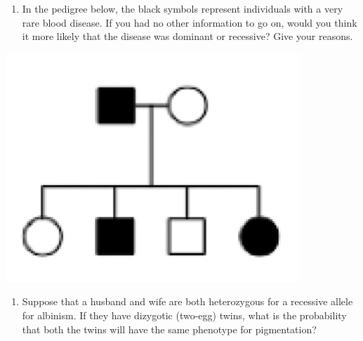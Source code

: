 \documentclass[11pt,]{article}
\providecommand{\tightlist}{%
  \setlength{\itemsep}{0pt}\setlength{\parskip}{0pt}}
\begin{document}
\begin{blackbox}

\begin{enumerate}
\def\labelenumi{\arabic{enumi}.}
\setcounter{enumi}{42}
\tightlist
\item
  In the pedigree below, the black symbols represent individuals with a
  very rare blood disease. If you had no other information to go on,
  would you think it more likely that the disease was dominant or
  recessive? Give your reasons.
\end{enumerate}

\hfill\break

\begin{center}\includegraphics[width=0.35\linewidth,]{input/43pedigree} \end{center}

\vspace{15cm}

\end{blackbox}

\begin{blackbox}

\begin{enumerate}
\def\labelenumi{\arabic{enumi}.}
\setcounter{enumi}{45}
\tightlist
\item
  Suppose that a husband and wife are both heterozygous for a recessive
  allele for albinism. If they have dizygotic (two-egg) twins, what is
  the probability that both the twins will have the same phenotype for
  pigmentation?
\end{enumerate}

\vspace{20cm}

\end{blackbox}
\end{document}
